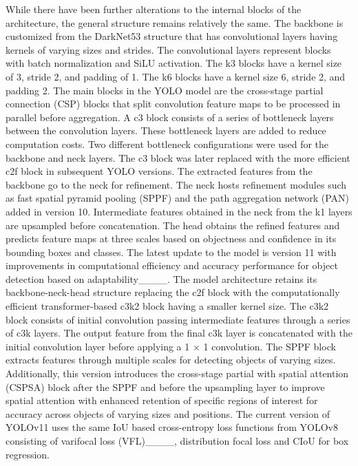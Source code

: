 While there have been further alterations to the internal blocks of the architecture, the general structure remains relatively the same. The backbone is customized from the DarkNet53 structure that has convolutional layers having kernels of varying sizes and strides. The convolutional layers represent blocks with batch normalization and SiLU activation. The k3 blocks have a kernel size of 3, stride 2, and padding of 1. The k6 blocks have a kernel size 6, stride 2, and padding 2. The main blocks in the YOLO model are the cross-stage partial connection (CSP) blocks that split convolution feature maps to be processed in parallel before aggregation. A c3 block consists of a series of bottleneck layers between the convolution layers. These bottleneck layers are added to reduce computation costs. Two different bottleneck configurations were used for the backbone and neck layers. The c3 block was later replaced with the more efficient c2f block in subsequent YOLO versions. The extracted features from the backbone go to the neck for refinement. The neck hosts refinement modules such as fast spatial pyramid pooling (SPPF) and the path aggregation network (PAN) added in version 10. Intermediate features obtained in the neck from the k1 layers are upsampled before concatenation. The head obtains the refined features and predicts feature maps at three scales based on objectness and confidence in its bounding boxes and classes. The latest update to the model is version 11 with improvements in computational efficiency and accuracy performance for object detection based on adaptability____. The model architecture retains its backbone-neck-head structure replacing the c2f block with the computationally efficient transformer-based c3k2 block having a smaller kernel size. The c3k2 block consists of initial convolution passing intermediate features through a series of c3k layers. The output feature from the final c3k layer is concatenated with the initial convolution layer before applying a 1 $\times$ 1 convolution. The SPPF block extracts features through multiple scales for detecting objects of varying sizes. Additionally, this version introduces the cross-stage partial with spatial attention (CSPSA) block after the SPPF and before the upsampling layer to improve spatial attention with enhanced retention of specific regions of interest for accuracy across objects of varying sizes and positions.
The current version of YOLOv11 uses the same IoU based cross-entropy loss functions from YOLOv8 consisting of varifocal loss (VFL)____, distribution focal loss and CIoU for box regression.





